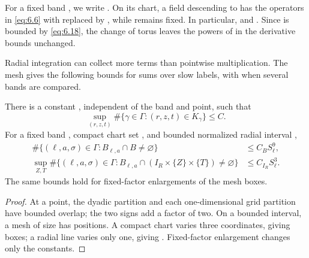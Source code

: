 %
For a fixed band , we write
. On its chart, a field descending to
 has the operators in \eqref{eq:6.6} with
 replaced by , while
 remains fixed. In particular,
 and
. Since
 is bounded by \eqref{eq:6.18}, the change of torus
leaves the powers of  in the derivative bounds
unchanged.

Radial integration can collect more terms than pointwise multiplication. The
mesh gives the following bounds for sums over slow labels, with
 when several bands are compared.

\begin{lemma}\label{lem:6.3}
There is a constant , independent of the band and point,
such that
\[
  \sup_{(r,z,t)}\#\{\gamma\in\Gamma:(r,z,t)\in K_\gamma\}\le C.
\]
For a fixed band , compact chart set
, and bounded normalized radial
interval ,
\[
  \begin{aligned}
    \#\{(\ell,a,\sigma)\in\Gamma:B_{\ell,a}\cap B\ne\varnothing\}
      &\le C_BS_\ell^9,\\
    \sup_{Z,T}\#\{(\ell,a,\sigma)\in\Gamma:
      B_{\ell,a}\cap(I_R\times\{Z\}\times\{T\})\ne\varnothing\}
      &\le C_{I_R}S_\ell^3.
  \end{aligned}
\]
The same bounds hold for fixed-factor enlargements of the mesh boxes.
\end{lemma}

\begin{proof}
At a point, the dyadic partition and each one-dimensional grid partition have
bounded overlap; the two signs add a factor of two. On a bounded interval, a
mesh of size  has
 positions. A compact chart varies three
coordinates, giving  boxes; a radial line
varies only one, giving . Fixed-factor
enlargement changes only the constants.
\end{proof}

